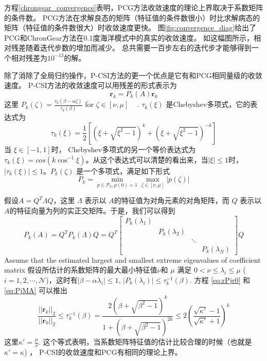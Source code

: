 方程\ref{chrongear_convergence}表明，PCG方法收敛速度的理论上界取决于系数矩阵的条件数。 
PCG方法在求解良态的矩阵（特征值的条件数很小）时比求解病态的矩阵（特征值的条件数很大）时收敛速度更快。 
图\ref{fig:convergence_diag}给出了PCG和ChronGear方法在0.1度海洋模式中的真实的收敛速度。
如这幅图所示，相对残差随着迭代步数的增加而减少。
总共需要一百步左右的迭代步才能够得到一个相对残差为$10^{-13}$的解。
 

 
除了消除了全局归约操作，P-CSI方法的更一个优点是它有和PCG相同量级的收敛速度。 
P-CSI方法的收敛速度可以用残差的形式表示为
\begin{equation}
\textbf{r}_k = P_k(A)\textbf{r}_0 \label{eq:rPjr0}
\end{equation}
这里
$P_k(\zeta) = \frac{\tau_k(\beta-\alpha \zeta)}{\tau_k(\beta)}$ for $ \zeta \in [\nu, \mu]$ ~\citep{stiefel1958kernel} .
$\tau_k(\xi)$ 是Chebyshev多项式，它的表达式为  
\begin{equation}
\tau_k(\xi) =   \frac{1}{2}[(\xi+\sqrt{\xi^2-1})^k+(\xi+\sqrt{\xi^2-1})^{-k}]
\end{equation}
当 $ \xi \in [-1,1]$时， Chebyshev多项式的另一个等价表达式为$\tau_k(\xi) = cos(k\cos^{-1} \xi)$。从这个表达式可以清楚的看出来，当$| \xi | \le 1$时， $|\tau_k(\xi)| \le 1$。$P_k(\zeta)$ 是一个多项式，满足如下形式
\begin{equation}
P_k = \min_{p\in \mathcal{P}_k, p(0) = 1 }\max_{\zeta \in [\nu,\mu]} |p(\zeta)|
\end{equation}

假设$A= Q^T\Lambda Q$，这里 $\Lambda$ 表示以  $A$的特征值为对角元素的对角矩阵，而 $Q$ 表示以  $A$的特征向量为列的实正交矩阵。于是，我们可以得到
\begin{equation}
P_k(A) = Q^T P_k(\Lambda)Q = Q^T \left [\begin{array}{cccc}
P_k(\lambda_1) & & &\\
& P_k(\lambda_2) & &\\
& & \ddots &\\
 & & & P_k(\lambda_N)
\end{array} \right ] Q \label{eq:PjMA}
\end{equation}
Assume that the estimated largest and smallest extreme eigenvalues of coefficient matrix 
假设所估计的系数矩阵的最大最小特征值$\nu$和 $\mu$ 满足 $0 < \nu \le \lambda_i \le \mu$ ($i = 1, 2, \cdots, \mathcal{N}$)，这时有$|\beta - \alpha \lambda_i| \le 1$, $|P_k(\lambda_i)| \le \tau^{-1}_k (\beta)$.
方程 \ref{eq:rPjr0} 和 \ref{eq:PjMA} 可以推出
\begin{equation}
\label{pcsi_convergence}
\frac{||\textbf{r}_k||_2}{||\textbf{r}_0||_2}  \le  \tau_k^{-1}(\beta) = \frac{2(\beta+\sqrt{\beta^2-1})^k}{1+(\beta+\sqrt{\beta^2-1})^{2k}} \le 2(\frac{\sqrt{\kappa'}-1}{\sqrt{\kappa'}+1})^k
\end{equation}
这里$\kappa' = \frac{\mu}{\nu}$.
 这个等式表明，当系数矩阵特征值的估计比较合理的时候（也就是$\kappa' =\kappa$) ， P-CSI的收敛速度和PCG有相同的理论上界。


